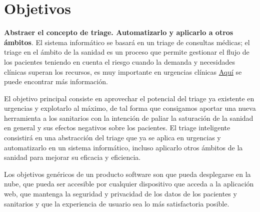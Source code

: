 \section{Objetivos}

\textbf{Abstraer el concepto de triage. Automatizarlo y aplicarlo a otros ámbitos}. El sistema informático se basará en un triage de consultas médicas; el triage en el ámbito
de la sanidad es un proceso que permite gestionar el flujo de los pacientes teniendo en cuenta el riesgo cuando la demanda y necesidades clínicas
superan los recursos, es muy importante en urgencias clínicas \href{https://scielo.isciii.es/scielo.php?script=sci_arttext&pid=S1137-66272010000200008}{Aquí}
se puede encontrar más información.

El objetivo principal consiste en aprovechar el potencial del triage ya existente en urgencias y explotarlo al máximo, de tal forma que
consigamos aportar una nueva herramienta a los sanitarios con la intención de paliar la saturación de la sanidad en general y sus efectos negativos sobre los pacientes.
El triage inteligente consistirá en una abstracción del triage que ya se aplica en urgencias y automatizarlo en un sistema informático, incluso aplicarlo
otros ámbitos de la sanidad para mejorar su eficacia y eficiencia.

Los objetivos genéricos de un producto software son que pueda desplegarse en la nube, que pueda ser accesible por cualquier dispositivo que acceda a la aplicación web,
que mantenga la seguridad y privacidad de los datos de los pacientes y sanitarios y que la experiencia de usuario sea lo más satisfactoria posible.

